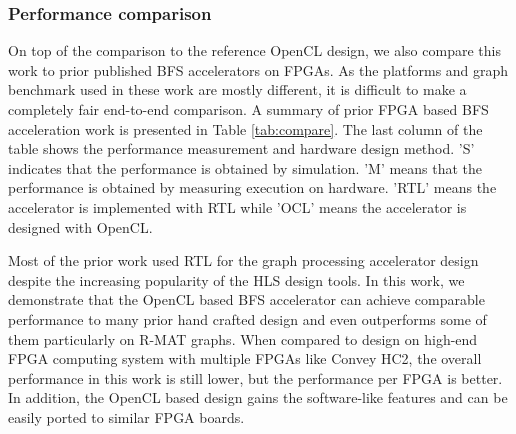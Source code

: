 \subsubsection{Performance comparison}
On top of the comparison to the reference OpenCL design, we also compare 
this work to prior published BFS accelerators on FPGAs. As the platforms 
and graph benchmark used in these work are mostly different, it is 
difficult to make a completely fair end-to-end comparison. 
A summary of prior FPGA based BFS acceleration work is presented in Table \ref{tab:compare}. 
The last column of the table shows the performance measurement and hardware design method. 
'S' indicates that the performance is obtained by simulation. 
'M' means that the performance is obtained by measuring execution on hardware. 
'RTL' means the accelerator is implemented with RTL while 'OCL' means the 
accelerator is designed with OpenCL.

Most of the prior work used RTL for the graph processing accelerator design
despite the increasing popularity of the HLS design tools.
In this work, we demonstrate that the OpenCL based BFS accelerator can achieve
comparable performance to many prior hand crafted design and even 
outperforms some of them particularly on R-MAT graphs. When compared to design on high-end 
FPGA computing system with multiple FPGAs like Convey HC2\cite{attia2014cygraph}, 
the overall performance in this work is still lower, 
but the performance per FPGA is better. In addition, the OpenCL based design 
gains the software-like features and can be easily ported to similar FPGA boards.

